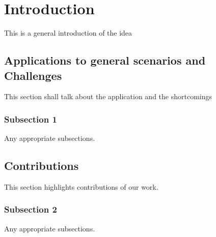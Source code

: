 \documentclass[12pt]{report}
\begin{document}
\tableofcontents
\pagebreak

\listoffigures
\pagebreak

\listoftables
\pagebreak

\printacronyms
\pagebreak

\pagestyle{myheadings}



\chapter{Introduction} %

\label{introduction} %

This is a general introduction of the idea

\section{Applications to general scenarios and Challenges}
This section shall talk about the application and the shortcomings


\subsection{Subsection 1}
Any appropriate subsections.



\section{Contributions}

This section highlights contributions of our work.

\subsection{Subsection 2}
Any appropriate subsections. 
\end{document}
